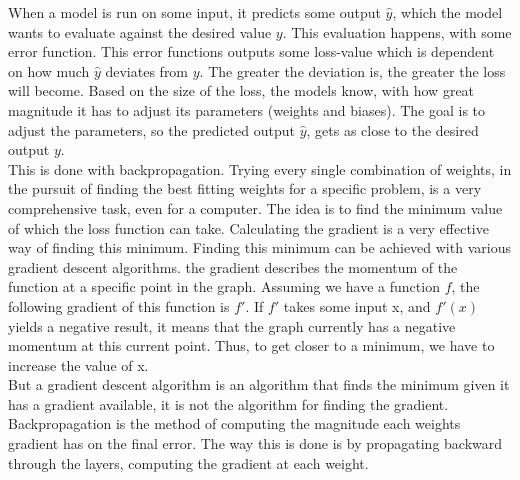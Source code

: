 When a model is run on some input, it predicts some output $\hat{y}$, which the model wants to evaluate against the desired value $y$. This evaluation happens, with some error function. This error functions outputs some loss-value which is dependent on how much $\hat{y}$ deviates from $y$. The greater the deviation is, the greater the loss will become.
Based on the size of the loss, the models know, with how great magnitude it has to adjust its parameters (weights and biases). The goal is to adjust the parameters, so the predicted output $\hat{y}$, gets as close to the desired output $y$.\\

\noindent
This is done with backpropagation. Trying every single combination of weights, in the pursuit of finding the best fitting weights for a specific problem, is a very comprehensive task, even for a computer. The idea is to find the minimum value of which the loss function can take. Calculating the gradient is a very effective way of finding this minimum. Finding this minimum can be achieved with various gradient descent algorithms. the gradient describes the momentum of the function at a specific point in the graph. Assuming we have a function $f$, the following gradient of this function is $f'$. If $f'$ takes some input x, and $f'(x)$ yields a negative result, it means that the graph currently has a negative momentum at this current point. Thus, to get closer to a minimum, we have to increase the value of x. \\

\noindent
But a gradient descent algorithm is an algorithm that finds the minimum given it has a gradient available, it is not the algorithm for finding the gradient. Backpropagation is the method of computing the magnitude each weights gradient has on the final error. The way this is done is by propagating backward through the layers, computing the gradient at each weight. \\

\noindent

